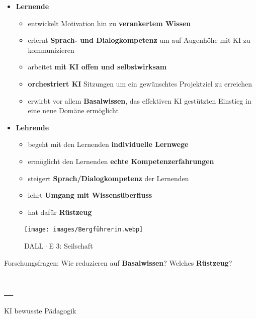 \documentclass[
  letterpaper,
  DIV=11,
  numbers=noendperiod]{scrartcl}
\providecommand{\tightlist}{%
  \setlength{\itemsep}{0pt}\setlength{\parskip}{0pt}}\usepackage{longtable,booktabs,array}
\begin{document}
\begin{itemize}
\tightlist
\item
  \textbf{Lernende}

  \begin{itemize}
  \tightlist
  \item
    entwickelt Motivation hin zu {\textbf{verankertem Wissen}}
  \item
    erlernt {\textbf{Sprach- und Dialogkompetenz}} um auf Augenhöhe mit
    KI zu kommunizieren
  \item
    arbeitet {\textbf{mit KI offen und selbstwirksam}}
  \item
    {\textbf{orchestriert KI}} Sitzungen um ein gewünschtes Projektziel
    zu erreichen
  \item
    erwirbt vor allem {\textbf{Basalwissen}}, das effektiven KI
    gestützten Einstieg in eine neue Domäne ermöglicht
  \end{itemize}
\item
  \textbf{Lehrende}

  \begin{itemize}
  \tightlist
  \item
    begeht mit den Lernenden {\textbf{individuelle Lernwege}}
  \item
    ermöglicht den Lernenden {\textbf{echte Kompetenzerfahrungen}}
  \item
    steigert {\textbf{Sprach/Dialogkompetenz}} der Lernenden
  \item
    lehrt {\textbf{Umgang mit Wissensüberfluss}}
  \item
    hat dafür {\textbf{Rüstzeug}}
  \end{itemize}
\end{itemize}

\begin{figure}[H]

{\centering \texttt{[image: images/Bergführerin.webp]}

}

\caption{DALL·E 3: Seilschaft}

\end{figure}%

Forschungsfragen: Wie reduzieren auf {\textbf{Basalwissen}}? Welches
{\textbf{Rüstzeug}}?

\subsection{\_}\label{section-2}

KI bewusste Pädagogik
\end{document}
